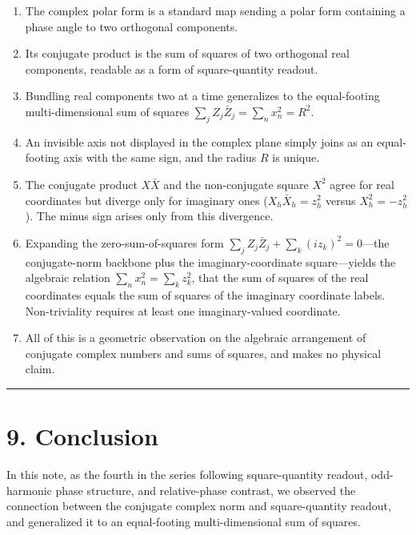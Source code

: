 \documentclass[11pt,a4paper]{article}
\providecommand{\tightlist}{\setlength{\itemsep}{0pt}\setlength{\parskip}{0pt}}
\begin{document}
\begin{enumerate}
\def\labelenumi{\arabic{enumi}.}
\tightlist
\item
  The complex polar form is a standard map sending a polar form
  containing a phase angle to two orthogonal components.
\item
  Its conjugate product is the sum of squares of two orthogonal real
  components, readable as a form of square-quantity readout.
\item
  Bundling real components two at a time generalizes to the
  equal-footing multi-dimensional sum of squares
  \(\sum_j Z_j\bar Z_j=\sum_n x_n^2=R^2\).
\item
  An invisible axis not displayed in the complex plane simply joins as
  an equal-footing axis with the same sign, and the radius \(R\) is
  unique.
\item
  The conjugate product \(X\bar X\) and the non-conjugate square \(X^2\)
  agree for real coordinates but diverge only for imaginary ones
  (\(X_h\bar X_h=z_h^2\) versus \(X_h^2=-z_h^2\)). The minus sign arises
  only from this divergence.
\item
  Expanding the zero-sum-of-squares form
  \(\sum_j Z_j\bar Z_j+\sum_k (i z_k)^2=0\)---the conjugate-norm
  backbone plus the imaginary-coordinate square---yields the algebraic
  relation \(\sum_n x_n^2=\sum_k z_k^2\), that the sum of squares of the
  real coordinates equals the sum of squares of the imaginary coordinate
  labels. Non-triviality requires at least one imaginary-valued
  coordinate.
\item
  All of this is a geometric observation on the algebraic arrangement of
  conjugate complex numbers and sums of squares, and makes no physical
  claim.
\end{enumerate}

\begin{center}\rule{0.5\linewidth}{0.5pt}\end{center}

\section{9. Conclusion}\label{conclusion}

In this note, as the fourth in the series following square-quantity
readout, odd-harmonic phase structure, and relative-phase contrast, we
observed the connection between the conjugate complex norm and
square-quantity readout, and generalized it to an equal-footing
multi-dimensional sum of squares.
\end{document}
